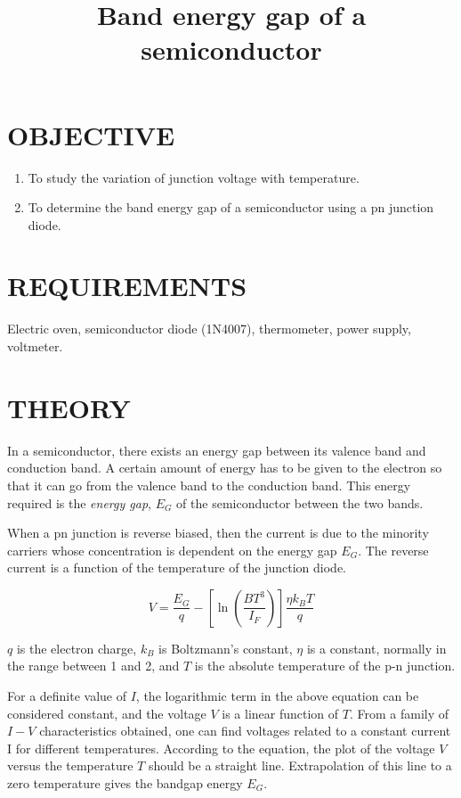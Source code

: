 \documentclass[12pt,a4paper]{article}
\title{Band energy gap of a semiconductor}
\begin{document}
	\maketitle 
	
	\section{OBJECTIVE}
		
		\begin{enumerate}
			\item To study the variation of junction voltage with temperature.
			
			\item To determine the band energy gap of a semiconductor using a pn junction diode.
		\end{enumerate}
	
	\section{REQUIREMENTS}
		
		Electric oven, semiconductor diode (1N4007), thermometer, power supply, voltmeter.
	
	\section{THEORY}
		
		In a semiconductor, there exists an energy gap between its valence band and conduction band. A certain amount of energy has to be given to the electron so that it can go from the valence band to the conduction band. This energy required is the \textit{energy gap}, $E_G$ of the semiconductor between the two bands.
		
		When a pn junction is reverse biased, then the current is due to the minority carriers whose concentration is dependent on the energy gap $E_G$. The reverse current is a function of the temperature of the junction diode.
		
		$$V = \dfrac{E_G}{q} - \left[\ln\left(\dfrac{BT^{3}}{I_F}\right)\right]\dfrac{\eta k_{B} T}{q} $$
		
		$q$ is the electron charge, $k_B$ is
		Boltzmann’s constant, $\eta$ is a constant, normally in the range between 1 and 2,
		and $T$ is the absolute temperature of the p-n junction.
		
		For a definite value of $I$, the logarithmic term in the above equation can be considered constant, and the voltage $V$ is a linear function of $T$. From a family of $I-V$ characteristics obtained, one can find voltages related to a constant current I for different temperatures. According to the equation, the plot of the voltage $V$ versus the temperature $T$ should be a straight line. Extrapolation of this line to a zero temperature gives the bandgap energy $E_G$. 
		
\end{document}
